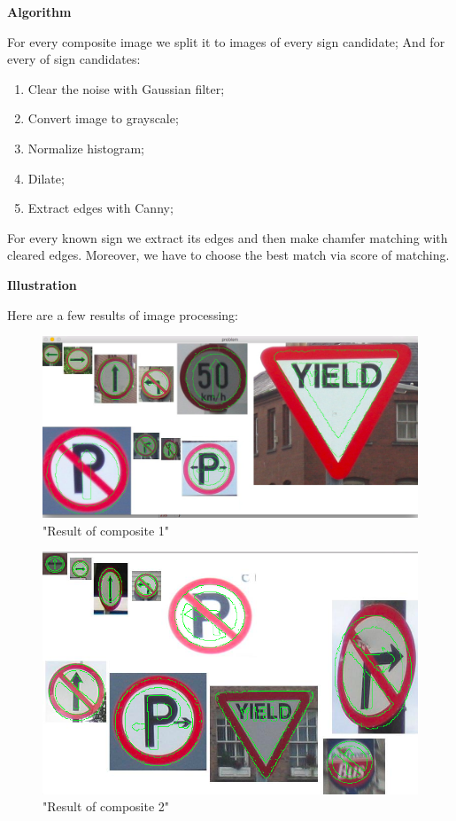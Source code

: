 \documentclass[12pt]{article}
\begin{document}
	\bigskip
	\textbf{Algorithm}
	
For every composite image  we split it to images of every sign candidate;
And for every of sign candidates:\\
	\begin{enumerate}
		\item Clear the noise with Gaussian filter;
		\item Convert image to grayscale;
		\item Normalize histogram;
		\item Dilate;
		\item Extract edges with Canny;
	\end{enumerate}
	
	For every known sign we extract its edges and then make chamfer matching with cleared edges. Moreover, we have to choose the best match via score of matching.
	
	\textbf{Illustration}
	
	Here are a few results of image processing:\\
	
	\begin{figure}[H]
		\centering
		\includegraphics[width=15cm]{1}
		\caption{"Result of composite 1"}
	\end{figure}
	
	\begin{figure}[H]
		\centering
		\includegraphics[width=15cm]{2}
		\caption{"Result of composite 2"}
	\end{figure}
	
\end{document}
